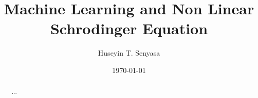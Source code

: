 \documentclass[%
 reprint,
 amsmath,amssymb,
 aps,
]{revtex4-1}
\begin{document}

\title{Machine Learning and Non Linear Schrodinger Equation}%

\author{Huseyin T. Senyasa}
%
%
%

\date{\today}%

\begin{abstract}
...
\end{abstract}

\maketitle
\end{document}
